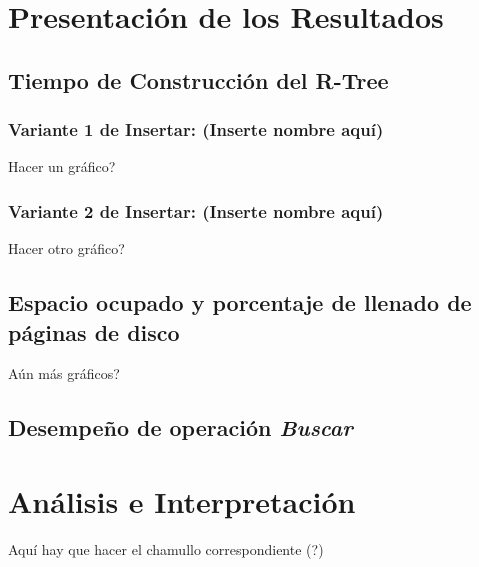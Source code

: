 \documentclass[letterpaper,10pt]{article}
\begin{document}
	\section*{Presentación de los Resultados}

	\subsection*{Tiempo de Construcción del R-Tree}
	\subsubsection*{Variante 1 de Insertar: (Inserte nombre aquí)}
	Hacer un gráfico?

	\subsubsection*{Variante 2 de Insertar: (Inserte nombre aquí)}
	Hacer otro gráfico?

	\subsection*{Espacio ocupado y porcentaje de llenado de páginas de disco}
	Aún más gráficos?

	\subsection*{Desempeño de operación \textit{Buscar}}

	\pagebreak

	\section*{Análisis e Interpretación}
	Aquí hay que hacer el chamullo correspondiente (?)
\end{document}
